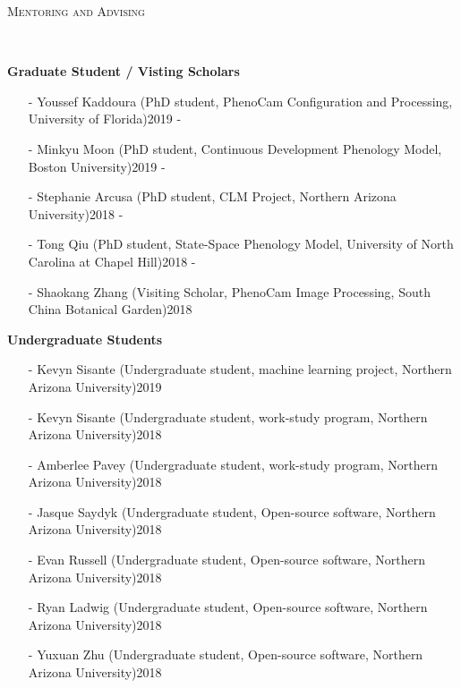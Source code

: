 \documentclass[10pt]{article}
\newenvironment{changemargin}[2]{%
  \begin{list}{}{%
 \setlength{\topsep}{0pt}%
 \setlength{\leftmargin}{#1}%
 \setlength{\rightmargin}{#2}%
 \setlength{\listparindent}{\parindent}%
 \setlength{\itemindent}{\parindent}%
 \setlength{\parsep}{\parskip}%
  }%
  \item[]}{\end{list}
}
\newcommand{\lineover}{
  \begin{changemargin}{-0.05in}{-0.05in}
  \vspace*{-8pt}
  \hrulefill \\
  \vspace*{-2pt}
  \end{changemargin}
}
\newcommand{\header}[1]{
  \begin{changemargin}{-0.5in}{-0.5in}
  \scshape{#1}\\
  \lineover
  \end{changemargin}
}
\newenvironment{body} {
  \vspace*{-2pt}
  \begin{changemargin}{-0.5in}{-0.5in}
}
{\end{changemargin}
}
\begin{document}
\header{Mentoring and Advising}
\begin{body}


  \textbf{Graduate Student / Visting Scholars}\\
  \vspace*{-4pt}
  \begin{itemize} \itemsep -0pt
    \item[-]  Youssef Kaddoura (PhD student, PhenoCam Configuration and Processing, University of Florida)\hfill {2019 -}\\
    \item[-]  Minkyu Moon (PhD student, Continuous Development Phenology Model, Boston University)\hfill {2019 -}\\
    \item[-]  Stephanie Arcusa (PhD student, CLM Project, Northern Arizona University)\hfill {2018 -}\\
    \item[-]  Tong Qiu (PhD student, State-Space Phenology Model, University of North Carolina at Chapel Hill)\hfill {2018 -}\\
    \item[-]  Shaokang Zhang (Visiting Scholar, PhenoCam Image Processing, South China Botanical Garden)\hfill {2018}\\
  \end{itemize}

  \medskip
  \textbf{Undergraduate Students}\\
  \vspace*{-4pt}
  \begin{itemize} \itemsep -0pt
    \item[-]  Kevyn Sisante (Undergraduate student, machine learning project, Northern Arizona University)\hfill {2019}\\
    \item[-]  Kevyn Sisante (Undergraduate student, work-study program, Northern Arizona University)\hfill {2018}\\
    \item[-]  Amberlee Pavey (Undergraduate student, work-study program, Northern Arizona University)\hfill {2018}\\
    \item[-]  Jasque Saydyk (Undergraduate student, Open-source software, Northern Arizona University)\hfill {2018}\\
    \item[-]  Evan Russell (Undergraduate student, Open-source software, Northern Arizona University)\hfill {2018}\\
    \item[-]  Ryan Ladwig (Undergraduate student, Open-source software, Northern Arizona University)\hfill {2018}\\
    \item[-]  Yuxuan Zhu (Undergraduate student, Open-source software, Northern Arizona University)\hfill {2018}\\
  \end{itemize}

  \medskip

\end{body}
\medskip
\end{document}
